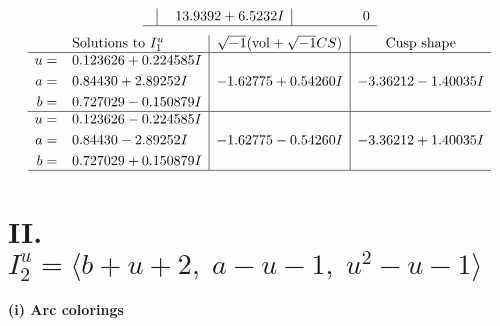 \documentclass[1p]{elsarticle_modified}
\theoremstyle{definition}
\newcommand{\I}{\sqrt{-1}}
\begin{document}
$$\begin{array}{c|c|c}
 & \phantom{-}13.9392 + 6.5232 I & \phantom{-0.000000 } 0\\
 \hline 
 \end{array}$$\newpage$$\begin{array}{c|c|c}  
\text{Solutions to }I^u_{1}& \I (\text{vol} + \sqrt{-1}CS) & \text{Cusp shape}\\
 \hline 
\begin{aligned}
u &= \phantom{-}0.123626 + 0.224585 I \\
a &= \phantom{-}0.84430 + 2.89252 I \\
b &= \phantom{-}0.727029 - 0.150879 I\end{aligned}
 & -1.62775 + 0.54260 I & -3.36212 - 1.40035 I \\ \hline\begin{aligned}
u &= \phantom{-}0.123626 - 0.224585 I \\
a &= \phantom{-}0.84430 - 2.89252 I \\
b &= \phantom{-}0.727029 + 0.150879 I\end{aligned}
 & -1.62775 - 0.54260 I & -3.36212 + 1.40035 I\\
 \hline 
 \end{array}$$\newpage\newpage\renewcommand{\arraystretch}{1}
\centering \section*{II. $I^u_{2}= \langle b+u+2,\;a- u-1,\;u^2- u-1 \rangle$}
\flushleft \textbf{(i) Arc colorings}\\
\end{document}
